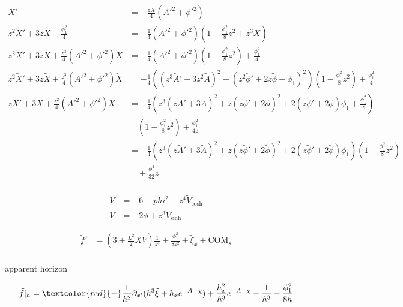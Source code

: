 \documentclass[12pt,a4paper]{ctexart}
\numberwithin{equation}{section}
\begin{document}
\begin{equation}
    \begin{aligned}
        X'&=-\frac{zX}{4}(A'^2+\phi'^2)\\
        z^2\tilde{X}'+3z\tilde{X}-\frac{\phi_1^2}{4}&=-\frac{1}{4}(A'^2+\phi'^2)(1-\frac{\phi_1^2}{8}z^2+z^3\tilde{X})\\
        z^2\tilde{X}'+3z\tilde{X}+\frac{z^3}{4}(A'^2+\phi'^2)\tilde{X}&=-\frac{1}{4}(A'^2+\phi'^2)(1-\frac{\phi_1^2}{8}z^2)+\frac{\phi_1^2}{4}\\
        z^2\tilde{X}'+3z\tilde{X}+\frac{z^3}{4}(A'^2+\phi'^2)\tilde{X}&=-\frac{1}{4}((z^3\tilde{A}'+3z^2\tilde{A})^2+(z^2\tilde{\phi}'+2z\tilde{\phi}+\phi_1)^2)(1-\frac{\phi_1^2}{8}z^2)+\frac{\phi_1^2}{4}\\
        z\tilde{X}'+3\tilde{X}+\frac{z^2}{4}(A'^2+\phi'^2)\tilde{X}&=-\frac{1}{4}(z^3(z\tilde{A}'+3\tilde{A})^2+z(z\tilde{\phi}'+2\tilde{\phi})^2+2(z\tilde{\phi}'+2\tilde{\phi})\phi_1+\frac{\phi_1^2}{z})\\
        &\quad(1-\frac{\phi_1^2}{8}z^2)+\frac{\phi_1^2}{4z}\\
        &=-\frac{1}{4}(z^3(z\tilde{A}'+3\tilde{A})^2+z(z\tilde{\phi}'+2\tilde{\phi})^2+2(z\tilde{\phi}'+2\tilde{\phi})\phi_1)(1-\frac{\phi_1^2}{8}z^2)\\
        &\quad+\frac{\phi_1^4}{32}z\\
    \end{aligned}
\end{equation}

\begin{equation}
    \begin{aligned}
       V&=-6-phi^2+z^4\tilde{V}_\mathrm{cosh}\\
       V&=-2\phi+z^3\tilde{V}_\mathrm{sinh}
    \end{aligned}
\end{equation}

\begin{equation}
    \begin{aligned}
        \tilde{f}'&=(3+\frac{L^{2}}{2}XV)\frac{1}{z^4}+\frac{\phi_1^2}{8z^2}+\tilde{\xi}_{x}+\mathrm{COM}_s\\
    \end{aligned}
\end{equation}

apparent horizon

\begin{equation}
    \tilde{f}|_h=\textcolor{red}{-}\frac{1}{h^2}\partial_{x'}(h^3\tilde{\xi}+h_{x}e^{-A-\chi})+\frac{h_{x}^2}{h^3}e^{-A-\chi}-\frac{1}{h^3}-\frac{\phi_1^2}{8h}
\end{equation}
\end{document}

